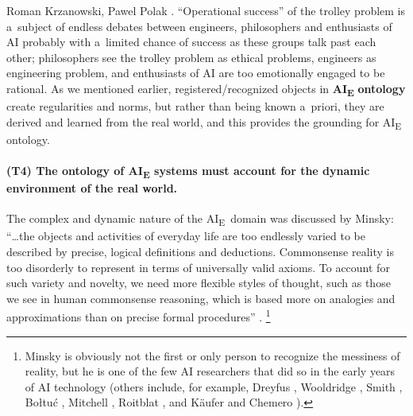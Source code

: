 \begin{artengenv2auth}{Roman Krzanowski, Pawel Polak}
\parencite[see e.g.,][]{cathcart_trolley_2013}. %
 ``Operational success'' of the trolley problem is a~subject of endless debates between engineers, philosophers and enthusiasts of AI probably with a~limited chance of success as these groups talk past each other; philosophers see the trolley problem as ethical problems, engineers as engineering problem, and enthusiasts of AI are too emotionally engaged to be rational. As we mentioned earlier, registered/recognized objects in \textbf{AI}\textbf{\textsubscript{E}} \textbf{ontology} create regularities and norms, but rather than being known a~priori, they are derived and learned from the real world, and this provides the grounding for AI\textsubscript{E} ontology.

\paragraph{(T4) The ontology of AI\textsubscript{E} systems must account for the dynamic environment of the real world.}
The complex and dynamic nature of the AI\textsubscript{E}~domain was discussed by Minsky: ``…the objects and activities of everyday life are too endlessly varied to be described by precise, logical definitions and deductions. Commonsense reality is too disorderly to represent in terms of universally valid axioms. To account for such variety and novelty, we need more flexible styles of thought, such as those we see in human commonsense reasoning, which is based more on analogies and approximations than on precise formal procedures''
\parencite[][p.6]{minsky_logical_1991}.%
\footnote{Minsky is obviously not the first or only person to recognize the messiness of reality, but he is one of the few AI researchers that did so in the early years of AI technology (others include, for example, Dreyfus 
\parencite*[][]{dreyfus_skillful_2016}, %
 Wooldridge 
\parencite*[][]{wooldridge_road_2021}, %
 Smith 
\parencite*[][]{smith_promise_2019}, %
 Bołtuć 
\parencite*[][]{boltuc_conscious_2020}, %
 Mitchell 
\parencite*[][]{mitchell_artificial_2019}, %
 Roitblat 
\parencite*[][]{roitblat_algorithms_2020}, %
 and Käufer and Chemero 
\parencite*[][]{kaufer_phenomenology_2021}%
).}


\end{artengenv2auth}
